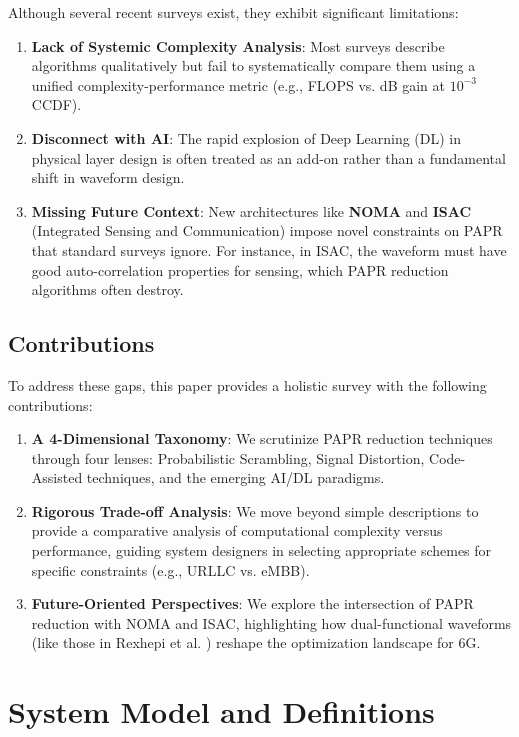 \documentclass[journal]{IEEEtran}
\begin{document}
Although several recent surveys exist, they exhibit significant limitations:

\begin{enumerate}
    \item \textbf{Lack of Systemic Complexity Analysis}: Most surveys describe algorithms qualitatively but fail to systematically compare them using a unified complexity-performance metric (e.g., FLOPS vs. dB gain at $10^{-3}$ CCDF).
    \item \textbf{Disconnect with AI}: The rapid explosion of Deep Learning (DL) in physical layer design is often treated as an add-on rather than a fundamental shift in waveform design.
    \item \textbf{Missing Future Context}: New architectures like \textbf{NOMA} and \textbf{ISAC} (Integrated Sensing and Communication) impose novel constraints on PAPR that standard surveys ignore. For instance, in ISAC, the waveform must have good auto-correlation properties for sensing, which PAPR reduction algorithms often destroy.
\end{enumerate}

\subsection{Contributions}
To address these gaps, this paper provides a holistic survey with the following contributions:

\begin{enumerate}
    \item \textbf{A 4-Dimensional Taxonomy}: We scrutinize PAPR reduction techniques through four lenses: Probabilistic Scrambling, Signal Distortion, Code-Assisted techniques, and the emerging AI/DL paradigms.
    \item \textbf{Rigorous Trade-off Analysis}: We move beyond simple descriptions to provide a comparative analysis of computational complexity versus performance, guiding system designers in selecting appropriate schemes for specific constraints (e.g., URLLC vs. eMBB).
    \item \textbf{Future-Oriented Perspectives}: We explore the intersection of PAPR reduction with NOMA and ISAC, highlighting how dual-functional waveforms (like those in Rexhepi et al. \cite{ref4}) reshape the optimization landscape for 6G.
\end{enumerate}

\section{System Model and Definitions}
\end{document}
